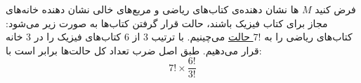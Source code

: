 \p
فرض کنید
 $M$
 ‌ها نشان دهنده‌ی کتاب‌های ریاضی و مربع‌های خالی نشان دهنده خانه‌های مجاز برای کتاب فیزیک باشند، حالت قرار گرفتن کتاب‌ها به صورت زیر می‌شود:
 کتاب‌های ریاضی را به
\underline{$7!$ حالت}
 می‌چینیم.
با ترتیب 3 از 6 
کتاب‌های فیزیک را در 
3 خانه قرار می‌دهیم.
طبق اصل ضرب تعداد کل حالت‌ها برابر است با:
$$7! \times \frac{6!}{3!}$$